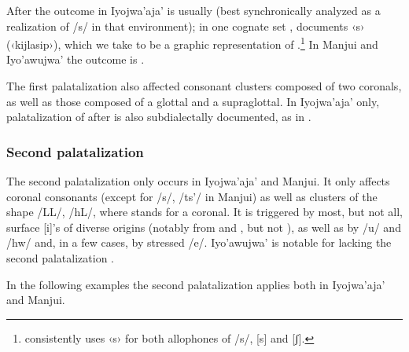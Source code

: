 After  the outcome in Iyojwa'aja' is usually  (best synchronically analyzed as a realization of /s/ in that environment); in one cognate set , \citet[136]{ND09} documents ‹s› (‹kijlasip›), which we take to be a graphic representation of .\footnote{\citet{ND09} consistently uses ‹s› for both allophones of /s/, [s] and [ʃ].} In Manjui and Iyo'awujwa' the outcome is .

\begin{exe}
    \ex \cho{kéhla-jku-p}{fall season}{kíhla-ʃi-p]}{---}{kíhle-ʃe-p}\label{jky-kijlasip}
    \ex {}
    \ex {}
    \ex {}
\end{exe}

The first palatalization also affected consonant clusters composed of two coronals, as well as those composed of a glottal and a supraglottal. In Iyojwa’aja’ only, palatalization of  after  is also subdialectally documented, as in .

\subsubsection{Second palatalization}\label{ch-pal2}

The second palatalization only occurs in Iyojwa’aja’ and Manjui. It only affects coronal consonants (except for /s/, /ts'/ in Manjui) as well as clusters of the shape /LL/, /hL/, where  stands for a coronal. It is triggered by most, but not all, surface [i]'s of diverse origins (notably from  and , but not ), as well as by /u/ and /hw/ and, in a few cases, by stressed /e/. Iyo’awujwa’ is notable for lacking the second palatalization \citep[41--42]{AG83}.

In the following examples the second palatalization applies both in Iyojwa’aja’ and Manjui.

\begin{exe}
    \ex {}
    \ex {}
    \ex {}
    \ex {}
    \ex {}
    \ex {}
    \ex {}
\end{exe}

